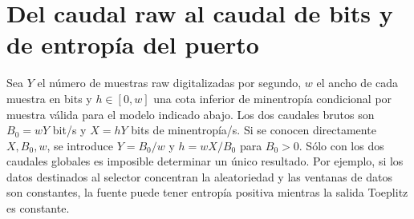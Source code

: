 \section{Del caudal raw al caudal de bits y de entropía del puerto}
\label{sec:port-rates}
Sea \(Y\) el número de muestras raw digitalizadas por segundo, \(w\) el
ancho de cada muestra en bits y \(h\in[0,w]\) una cota inferior de
minentropía condicional por muestra válida para el modelo indicado abajo.
Los dos caudales brutos son \(B_0=wY\) bit/s y \(X=hY\) bits de
minentropía/s. Si se conocen directamente \(X,B_0,w\), se introduce
\(Y=B_0/w\) y \(h=wX/B_0\) para \(B_0>0\).
Sólo con los dos caudales globales es imposible determinar un único resultado.
Por ejemplo, si los datos destinados al selector concentran la aleatoriedad
y las ventanas de datos son constantes, la fuente puede tener entropía
positiva mientras la salida Toeplitz es constante.

